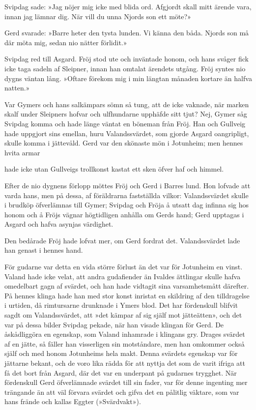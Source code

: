 Svipdag sade: »Jag nöjer mig icke med blida ord. Afgjordt skall mitt
ärende vara, innan jag lämnar dig. När vill du unna Njords son ett
möte?»

Gerd svarade: »Barre heter den tysta lunden. Vi känna den båda. Njords
son må där möta mig, sedan nio nätter förlidit.»

Svipdag red till Asgard. Fröj stod ute och inväntade honom, och hans
svåger fick icke taga sadeln af Sleipner, innan han omtalat ärendets
utgång. Fröj syntes nio dygns väntan lång. »Oftare förekom mig i min
längtan månaden kortare än halfva natten.»

Var Gymers och hans salkämpars sömn så tung, att de icke vaknade, när
marken skalf under Sleipners hofvar och ulfhundarne upphäfde sitt tjut?
Nej, Gymer såg Svipdag komma och hade länge väntat en böneman från Fröj.
Han och Gullveig hade uppgjort sins emellan, huru Valandssvärdet, som
gjorde Asgard oangripligt, skulle komma i jättevåld. Gerd var den
skönaste mön i Jotunheim; men hennes hvita armar

hade icke utan Gullveigs trollkonst kastat ett sken öfver haf och
himmel.

Efter de nio dygnens förlopp möttes Fröj och Gerd i Barres lund. Hon
lofvade att varda hans, men på dessa, af föräldrarna fastställda vilkor:
Valandssvärdet skulle i brudköp öfverlämnas till Gymer; Svipdag och
Fröja å utsatt dag infinna sig hos honom och å Fröjs vägnar högtidligen
anhålla om Gerds hand; Gerd upptagas i Asgard och hafva asynjas
värdighet.

Den bedårade Fröj hade lofvat mer, om Gerd fordrat det. Valandssvärdet
lade han genast i hennes hand.

För gudarne var detta en vida större förlust än det var för Jotunheim en
vinst. Valand hade icke velat, att andra gudafiender än Ivaldes
ättlingar skulle hafva omedelbart gagn af svärdet, och han hade vidtagit
sina varsamhetsmått därefter. På hennes klinga hade han med stor konst
inristat en skildring af den tilldragelse i urtiden, då rimtursarne
drunknade i Ymers blod. Det har fördenskull blifvit sagdt om
Valandssvärdet, att »det kämpar af sig själf mot jätteätten», och det
var på dessa bilder Svipdag pekade, när han visade klingan för Gerd. De
åskådliggöra en egenskap, som Valand inhamrade i klingans gry. Drages
svärdet af en jätte, så fäller han visserligen sin motståndare, men han
omkommer också själf och med honom Jotunheims hela makt. Denna svärdets
egenskap var för jättarne bekant, och de voro lika rädda för att nyttja
det som de varit ifriga att få det bort från Asgard, där det var en
underpant på gudarnes trygghet. När fördenskull Gerd öfverlämnade
svärdet till sin fader, var för denne ingenting mer trängande än att väl
förvara svärdet och gifva det en pålitlig väktare, som var hans frände
och kallas Eggter (»Svärdvakt»).

